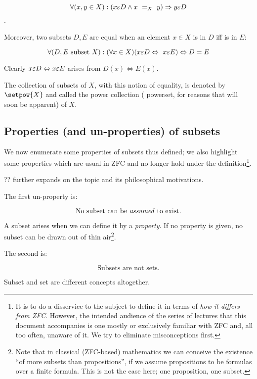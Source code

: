 \[ \forall (x, y \in X) : (x \varepsilon D \wedge x\ =_X\ y) \Rightarrow y \varepsilon D \].

Moreover, two subsets \(D, E\) are equal when an element \(x \in X\)
is in \(D\) iff is in \(E\):

\[ \forall (D, E\ \text{subset}\ X) : (\forall x \in X)(
    x \varepsilon D \Leftrightarrow\ x \varepsilon E) \Leftrightarrow D = E \]

Clearly $x \varepsilon D \Leftrightarrow x \varepsilon E$ arises from
$D(x) \Leftrightarrow E(x)$.
    
The collection of subsets of \(X\), with this notion
of equality, is denoted by \(\setpow{X}\) and called the power
collection ( powerset, for reasons that will soon be
apparent) of \(X\).

\subsection{Properties (and un-properties) of subsets}

We now enumerate some properties of subsets thus defined; we also
highlight some properties which are usual in ZFC and no longer hold
under the definition\footnote{It is to do a disservice to the subject
  to define it in terms of \emph{how it differs from ZFC}.  However,
  the intended audience of the series of lectures that this document
  accompanies is one mostly or exclusively familiar with ZFC and, all
  too often, unaware of it. We try to eliminate misconceptions
  first.}.

?? further expands on the topic and its philosophical motivations.

The first un-property is:

\[ \text{No subset can be \emph{assumed} to exist.} \]

A subset arises when we can define it by a \emph{property}.  If no
property is given, no subset can be drawn out of thin
air\footnote{Note that in classical (ZFC-based) mathematics we can
  conceive the existence ``of more subsets than propositions'', if we
  assume propositions to be formulas over a finite formula.  This is
  not the case here; one proposition, one subset.}.

The second is:

\[ \text{Subsets are not sets.} \]

Subset and set are different concepts altogether.

